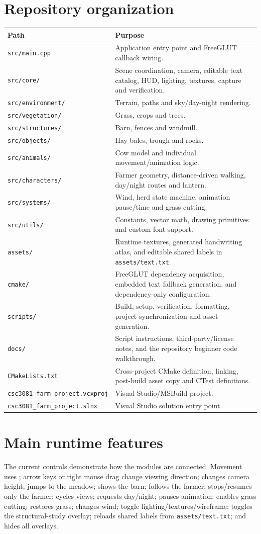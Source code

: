 \documentclass[11pt,a4paper,openany]{book}
\newcommand{\file}[1]{\nolinkurl{#1}}
\newcommand{\keycap}[1]{\begingroup\setlength{\fboxsep}{0.8pt}\raisebox{0.05ex}{\fbox{\footnotesize\texttt{#1}}}\endgroup}
\newcommand{\pathrow}[2]{\file{#1} & #2\\}
\begin{document}
\section{Repository organization}
\begin{longtable}{@{}p{}p{}@{}}
	\toprule
	Path & Purpose \\
	\midrule
	\endhead
	\pathrow{src/main.cpp}{Application entry point and FreeGLUT callback wiring.}
	\pathrow{src/core/}{Scene coordination, camera, editable text catalog, HUD, lighting, textures, capture and verification.}
	\pathrow{src/environment/}{Terrain, paths and sky/day-night rendering.}
	\pathrow{src/vegetation/}{Grass, crops and trees.}
	\pathrow{src/structures/}{Barn, fences and windmill.}
	\pathrow{src/objects/}{Hay bales, trough and rocks.}
	\pathrow{src/animals/}{Cow model and individual movement/animation logic.}
	\pathrow{src/characters/}{Farmer geometry, distance-driven walking, day/night routes and lantern.}
	\pathrow{src/systems/}{Wind, herd state machine, animation pause/time and grass cutting.}
	\pathrow{src/utils/}{Constants, vector math, drawing primitives and custom font support.}
	\pathrow{assets/}{Runtime textures, generated handwriting atlas, and editable shared labels in \file{assets/text.txt}.}
	\pathrow{cmake/}{FreeGLUT dependency acquisition, embedded text fallback generation, and dependency-only configuration.}
	\pathrow{scripts/}{Build, setup, verification, formatting, project synchronization and asset generation.}
	\pathrow{docs/}{Script instructions, third-party/license notes, and the repository beginner code walkthrough.}
	\pathrow{CMakeLists.txt}{Cross-project CMake definition, linking, post-build asset copy and CTest definitions.}
	\pathrow{csc3081\_farm\_project.vcxproj}{Visual Studio/MSBuild project.}
	\pathrow{csc3081\_farm\_project.slnx}{Visual Studio solution entry point.}
	\bottomrule
\end{longtable}

\section{Main runtime features}
The current controls demonstrate how the modules are connected. Movement uses \keycap{W/A/S/D}; arrow keys or right mouse drag change viewing direction; \keycap{Q/E} changes camera height; \keycap{G} jumps to the meadow; \keycap{H} shows the barn; \keycap{J} follows the farmer; \keycap{U} stops/resumes only the farmer; \keycap{Tab} cycles views; \keycap{N} requests day/night; \keycap{P} pauses animation; \keycap{C} enables grass cutting; \keycap{R} restores grass; \keycap{+/-} changes wind; \keycap{L/T/F} toggle lighting/textures/wireframe; \keycap{B} toggles the structural-study overlay; \keycap{F9} reloads shared labels from \file{assets/text.txt}; and \keycap{F10} hides all overlays.
\end{document}
